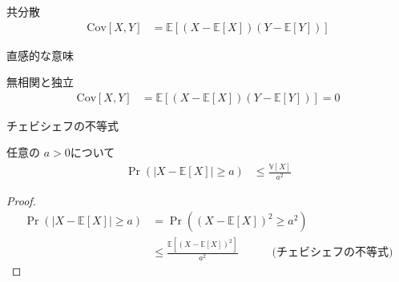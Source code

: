 \documentclass[lualatex,handout]{beamer}
\newcommand{\expt}[1]{\mathbb{E}[#1]}
\newcommand{\var}[1]{\mathbb{V}[#1]}
\newcommand{\cov}[1]{\mathrm{Cov}[#1]}
\theoremstyle{definition}
\begin{document}
\begin{frame}{共分散}
\begin{align*}
\cov{X,Y} &= \expt{(X-\expt{X})(Y-\expt{Y})}
\end{align*}

\vspace{1em}
直感的な意味
\end{frame}

\begin{frame}{無相関と独立}
\begin{align*}
\cov{X,Y} &= \expt{(X-\expt{X})(Y-\expt{Y})} = 0
\end{align*}
\end{frame}

\begin{frame}{チェビシェフの不等式}
\begin{lemma}[チェビシェフの不等式]
任意の $a>0$について
\begin{align*}
\Pr(|X-\expt{X}|\ge a) &\le \frac{\var{X}}{a^2}
\end{align*}
\end{lemma}
\begin{proof}
\begin{align*}
\Pr(|X-\expt{X}|\ge a) &=\Pr((X-\expt{X})^2\ge a^2)\\
&\le\frac{\expt{(X-\expt{X})^2}}{a^2}\hspace{3em}\text{(チェビシェフの不等式)}
\end{align*}
\end{proof}
\end{frame}
\end{document}
